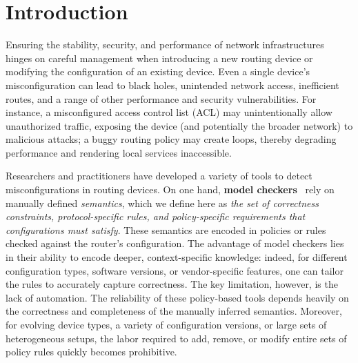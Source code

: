 
\section{Introduction}
\label{sec:intro}

Ensuring the stability, security, and performance of network infrastructures
hinges on careful management when introducing a new routing device or
modifying the configuration of an existing device. Even a single device's
misconfiguration can lead to black holes, unintended network access,
inefficient routes, and a range of other performance and security
vulnerabilities. For instance, a misconfigured access control list (ACL) may
unintentionally allow unauthorized traffic, exposing the device (and potentially
the broader network) to malicious attacks; a buggy routing policy may create
loops, thereby degrading performance and rendering local services inaccessible.

Researchers and practitioners have developed a variety of tools to detect
misconfigurations in routing devices. On one hand, \textbf{model
	checkers}~\cite{fogel2015general, beckett2017general, abhashkumar2020tiramisu,
	prabhu2020plankton, zhang2022sre, steffen2020netdice, ye2020hoyan,
	ritchey2000using,al2011configchecker, jeffrey2009model} rely on manually
defined \emph{semantics}, which we define here as \emph{the set of correctness
	constraints, protocol-specific rules, and policy-specific requirements that
	configurations must satisfy}.  These semantics are encoded in policies or rules
checked against the router's configuration.  The advantage of model checkers
lies in their ability to encode deeper,  context-specific knowledge: indeed,
for different configuration types, software versions, or vendor-specific
features, one can tailor the rules to accurately capture correctness. The key
limitation, however, is the lack of automation. The reliability of these
policy-based tools depends heavily on the correctness and completeness of the
manually inferred  semantics. Moreover, for evolving device types, a variety of
configuration versions, or large sets of heterogeneous setups, the labor
required to add, remove, or modify entire sets of policy rules quickly becomes
prohibitive. 

